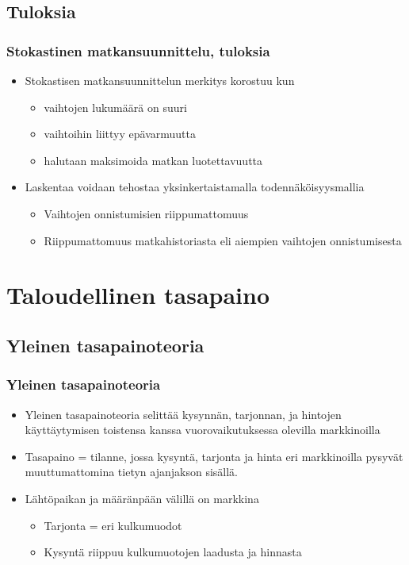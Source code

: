 \documentclass{beamer}
\newcommand*{\secpage}{\usebeamertemplate*{section pages}}
\begin{document}
    \subsection{Tuloksia}
        \begin{frame}
  \frametitle{Stokastinen matkansuunnittelu, tuloksia} 
  \begin{itemize}
   \item 
Stokastisen matkansuunnittelun merkitys korostuu kun 
\begin{itemize}
 \item 
vaihtojen lukumäärä on suuri 
\item
vaihtoihin liittyy epävarmuutta
\item
halutaan maksimoida matkan luotettavuutta
\end{itemize}
\item
Laskentaa voidaan tehostaa yksinkertaistamalla todennäköisyysmallia
\begin{itemize}
 \item 
Vaihtojen onnistumisien riippumattomuus
\item
Riippumattomuus matkahistoriasta eli aiempien vaihtojen onnistumisesta
\end{itemize}
\end{itemize}
    \end{frame}     
    
    
\section{Taloudellinen tasapaino}
\frame{\secpage}


\subsection{Yleinen tasapainoteoria}
\begin{frame}
  \frametitle{Yleinen tasapainoteoria} 
  \begin{itemize}
  \item
  Yleinen tasapainoteoria selittää kysynnän, tarjonnan, ja hintojen käyttäytymisen toistensa kanssa vuorovaikutuksessa
olevilla markkinoilla 
\item
Tasapaino = tilanne, jossa kysyntä, tarjonta ja hinta eri markkinoilla pysyvät muuttumattomina
tietyn ajanjakson sisällä.
\item
Lähtöpaikan ja määränpään välillä on markkina
\begin{itemize}
 \item 
 Tarjonta = eri kulkumuodot
 \item
 Kysyntä riippuu kulkumuotojen laadusta ja hinnasta
 \end{itemize}
   \end{itemize}
    \end{frame}   
    
\end{document}
